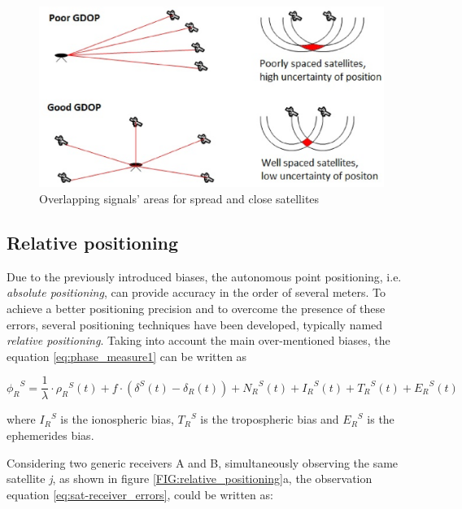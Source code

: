 \begin{figure}[ht] 
	\centering
	\includegraphics[scale=0.7]{fig/satellites_geometry.eps} 
	\caption{Overlapping signals' areas for spread and close satellites}
	\label{FIG:sat_geometry} 
\end{figure}


\subsection{Relative positioning}

Due to the previously introduced biases, the autonomous point positioning, i.e. \textit{absolute positioning}, can provide accuracy in the order of several meters. To achieve a better positioning precision and to overcome the presence of these errors, several positioning techniques have been developed, typically named \textit{relative positioning}.
Taking into account the main over-mentioned biases, the equation \ref{eq:phase_measure1} can be written as

\begin{equation}
	{\phi_{R}}^{S} = \frac{1}{\lambda}\cdot {\rho_{R}}^{S}(t) + f\cdot \left(\delta^{S}(t) - \delta_{R}(t)\right)+ {N_{R}}^{S}(t) + {I_{R}}^{S}(t) +{T_{R}}^{S}(t) + {E_{R}}^{S}(t)
	\label{eq:sat-receiver_errors}
\end{equation}

where ${I_{R}}^{S}$ is the ionospheric bias, ${T_{R}}^{S} $ is the tropospheric bias and $ {E_{R}}^{S} $ is the ephemerides bias.

Considering two generic receivers A and B, simultaneously observing the same satellite \textit{j}, as shown in figure \ref{FIG:relative_positioning}a, the observation equation \ref{eq:sat-receiver_errors}, could be written as:


